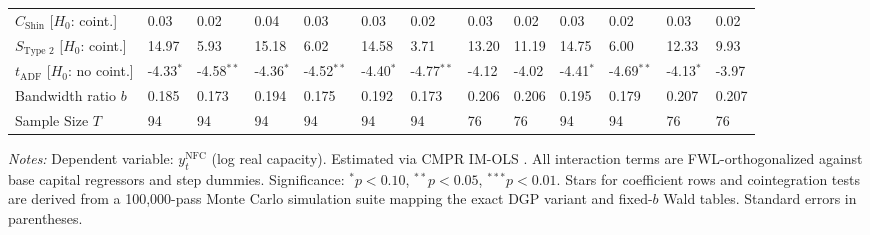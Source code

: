 \begin{table}[h!]
\begin{tabular}{p{3.2cm}p{1.0cm}p{1.0cm}p{1.0cm}p{1.0cm}p{1.0cm}p{1.0cm}p{1.0cm}p{1.0cm}p{1.0cm}p{1.0cm}p{1.0cm}p{1.0cm}}
$C_{\text{Shin}}$ [$H_0$: coint.] & 0.03 & 0.02 & 0.04 & 0.03 & 0.03 & 0.02 & 0.03 & 0.02 & 0.03 & 0.02 & 0.03 & 0.02 \\
$S_{\text{Type 2}}$ [$H_0$: coint.] & 14.97 & 5.93 & 15.18 & 6.02 & 14.58 & 3.71 & 13.20 & 11.19 & 14.75 & 6.00 & 12.33 & 9.93 \\
$t_{\text{ADF}}$ [$H_0$: no coint.] & -4.33$^{*}$ & -4.58$^{**}$ & -4.36$^{*}$ & -4.52$^{**}$ & -4.40$^{*}$ & -4.77$^{**}$ & -4.12 & -4.02 & -4.41$^{*}$ & -4.69$^{**}$ & -4.13$^{*}$ & -3.97 \\
Bandwidth ratio $b$ & 0.185 & 0.173 & 0.194 & 0.175 & 0.192 & 0.173 & 0.206 & 0.206 & 0.195 & 0.179 & 0.207 & 0.207 \\
Sample Size $T$ & 94 & 94 & 94 & 94 & 94 & 94 & 76 & 76 & 94 & 94 & 76 & 76 \\
\bottomrule
\end{tabular}
\begin{minipage}{\textwidth}
\scriptsize
\textit{Notes:} Dependent variable: $y_t^{\text{NFC}}$ (log real capacity). Estimated via CMPR IM-OLS \citep{VogelsangWagner2024}. All interaction terms are FWL-orthogonalized against base capital regressors and step dummies. Significance: $^*p<0.10$, $^{**}p<0.05$, $^{***}p<0.01$. Stars for coefficient rows and cointegration tests are derived from a 100,000-pass Monte Carlo simulation suite mapping the exact DGP variant and fixed-$b$ Wald tables. Standard errors in parentheses.
\end{minipage}
\end{table}


